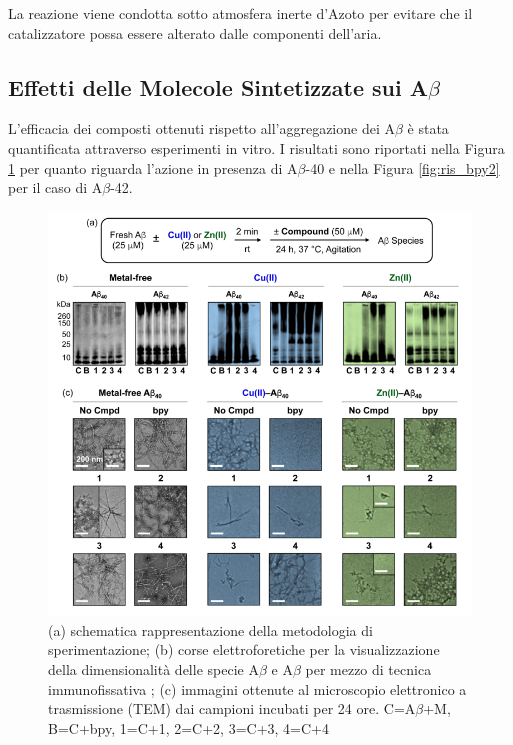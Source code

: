 \documentclass[a4paper, 12pt]{article}
\begin{document}
La reazione viene condotta sotto atmosfera inerte d'Azoto per evitare che il catalizzatore possa essere alterato dalle componenti dell'aria.

\subsection{Effetti delle Molecole Sintetizzate sui A\(\beta\)}
L'efficacia dei composti ottenuti rispetto all'aggregazione dei A\(\beta\) è stata quantificata attraverso esperimenti in vitro. I risultati sono riportati nella Figura \ref{fig:ris_bpy} per quanto riguarda l'azione in presenza di A\(\beta\)-40 e nella Figura \ref{fig:ris_bpy2} per il caso di A\(\beta\)-42.

\begin{figure}[H]
	\centering
	\includegraphics[width=\linewidth]{immagini/ris_bpy.png}
	\caption{(a) schematica rappresentazione della metodologia di sperimentazione; (b) corse elettroforetiche per la visualizzazione della dimensionalità delle specie A\(\beta\) e A\(\beta\) per mezzo di tecnica immunofissativa \autocite{kurien_western_2006}; (c) immagini ottenute al microscopio elettronico a trasmissione (TEM) dai campioni incubati per 24 ore. C=A\(\beta\)+M, B=C+bpy, 1=C+1, 2=C+2, 3=C+3, 4=C+4 }
	\label{fig:ris_bpy}
\end{figure}
\end{document}
